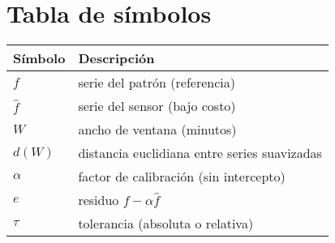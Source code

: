 \documentclass[11pt,a4paper]{article}
\begin{document}
\section{Tabla de símbolos}
\begin{center}
\begin{tabular}{ll}
\toprule
Símbolo & Descripción \\
\midrule
$f$ & serie del patrón (referencia) \\
$\hat f$ & serie del sensor (bajo costo) \\
$W$ & ancho de ventana (minutos) \\
$d(W)$ & distancia euclidiana entre series suavizadas \\
$\alpha$ & factor de calibración (sin intercepto) \\
$e$ & residuo $f-\alpha\hat f$ \\
$\tau$ & tolerancia (absoluta o relativa) \\
\bottomrule
\end{tabular}
\end{center}
\end{document}
